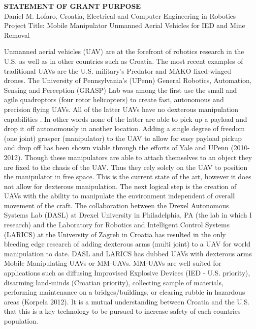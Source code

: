 \documentclass[12pt]{article}
\begin{document}
\begin{center}
\textbf{STATEMENT OF GRANT PURPOSE}\\
Daniel M. Lofaro, Croatia, Electrical and Computer Engineering in Robotics\\
Project Title: Mobile Manipulator Unmanned Aerial Vehicles for IED and Mine Removal\\

\end{center}

Unmanned aerial vehicles (UAV) are at the forefront of robotics research in the U.S. as well as in other countries such as Croatia.  
The most recent examples of traditional UAVs are the U.S. military's Predator and MAKO fixed-winged drones.  
The University of Pennsylvania's (UPenn) General Robotics, Automation, Sensing and Perception (GRASP) Lab was among the first use the small and agile quadroptors (four rotor helicopters) to create fast, autonomous and precision flying UAVs.  
All of the latter UAVs have no dexterous manipulation capabilities .
In other words none of the latter are able to pick up a payload and drop it off autonomously in another location.
Adding a single degree of freedom (one joint) grasper (manipulator) to the UAV to allow for easy payload pickup and drop off has been shown viable through the efforts of Yale and UPenn (2010-2012). 
Though these manipulators are able to attach themselves to an object they are fixed to the chasis of the UAV.
Thus they rely solely on the UAV to position the manipulator in free space.  
This is the current state of the art, however it does not allow for dexterous manipulation.  
The next logical step is the creation of UAVs with the ability to manipulate the environment independent of overall movement of the craft.  
The collaboration between the Drexel Autonomous Systems Lab (DASL) at Drexel University in Philadelphia, PA (the lab in which I research) and the Laboratory for Robotics and Intelligent Control Systems (LARICS) at the University of Zagreb in Croatia has resulted in the only bleeding edge research of adding dexterous arms (multi joint) to a UAV for world manipulation to date.  DASL and LARICS has dubbed UAVs with dexterous arms Mobile Manipulating UAVs or MM-UAVs. 
MM-UAVs are well suited for applications such as diffusing Improvised Explosive Devices (IED - U.S. priority), disarming land-minds (Croatian priority), collecting sample of materials, performing maintenance on a bridges/buildings, or clearing rubble in hazardous areas (Korpela 2012).  
It is a mutual understanding between Croatia and the U.S. that this is a key technology to be pursued to increase safety of each countries population.
\end{document}
